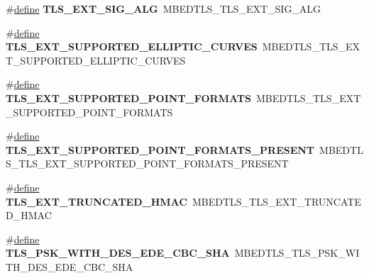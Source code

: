 \begin{DoxyCompactItemize}
\item 
\mbox{\label{compat-1_83_8h_a03991596f1740bf164b513d6e43c1f4c}} 
\#\hyperlink{structdefine}{define} {\bfseries T\+L\+S\+\_\+\+E\+X\+T\+\_\+\+S\+I\+G\+\_\+\+A\+LG}~M\+B\+E\+D\+T\+L\+S\+\_\+\+T\+L\+S\+\_\+\+E\+X\+T\+\_\+\+S\+I\+G\+\_\+\+A\+LG
\item 
\mbox{\label{compat-1_83_8h_a5027dcb3f9e79d66d008105a6a10b88b}} 
\#\hyperlink{structdefine}{define} {\bfseries T\+L\+S\+\_\+\+E\+X\+T\+\_\+\+S\+U\+P\+P\+O\+R\+T\+E\+D\+\_\+\+E\+L\+L\+I\+P\+T\+I\+C\+\_\+\+C\+U\+R\+V\+ES}~M\+B\+E\+D\+T\+L\+S\+\_\+\+T\+L\+S\+\_\+\+E\+X\+T\+\_\+\+S\+U\+P\+P\+O\+R\+T\+E\+D\+\_\+\+E\+L\+L\+I\+P\+T\+I\+C\+\_\+\+C\+U\+R\+V\+ES
\item 
\mbox{\label{compat-1_83_8h_af4c82017108e0645f315b12052e4c7b7}} 
\#\hyperlink{structdefine}{define} {\bfseries T\+L\+S\+\_\+\+E\+X\+T\+\_\+\+S\+U\+P\+P\+O\+R\+T\+E\+D\+\_\+\+P\+O\+I\+N\+T\+\_\+\+F\+O\+R\+M\+A\+TS}~M\+B\+E\+D\+T\+L\+S\+\_\+\+T\+L\+S\+\_\+\+E\+X\+T\+\_\+\+S\+U\+P\+P\+O\+R\+T\+E\+D\+\_\+\+P\+O\+I\+N\+T\+\_\+\+F\+O\+R\+M\+A\+TS
\item 
\mbox{\label{compat-1_83_8h_a66091f70d8cfd5a5d43d42c221612567}} 
\#\hyperlink{structdefine}{define} {\bfseries T\+L\+S\+\_\+\+E\+X\+T\+\_\+\+S\+U\+P\+P\+O\+R\+T\+E\+D\+\_\+\+P\+O\+I\+N\+T\+\_\+\+F\+O\+R\+M\+A\+T\+S\+\_\+\+P\+R\+E\+S\+E\+NT}~M\+B\+E\+D\+T\+L\+S\+\_\+\+T\+L\+S\+\_\+\+E\+X\+T\+\_\+\+S\+U\+P\+P\+O\+R\+T\+E\+D\+\_\+\+P\+O\+I\+N\+T\+\_\+\+F\+O\+R\+M\+A\+T\+S\+\_\+\+P\+R\+E\+S\+E\+NT
\item 
\mbox{\label{compat-1_83_8h_a11832588d5c48b20e1cefbb1149823aa}} 
\#\hyperlink{structdefine}{define} {\bfseries T\+L\+S\+\_\+\+E\+X\+T\+\_\+\+T\+R\+U\+N\+C\+A\+T\+E\+D\+\_\+\+H\+M\+AC}~M\+B\+E\+D\+T\+L\+S\+\_\+\+T\+L\+S\+\_\+\+E\+X\+T\+\_\+\+T\+R\+U\+N\+C\+A\+T\+E\+D\+\_\+\+H\+M\+AC
\item 
\mbox{\label{compat-1_83_8h_a467b50d6801535ae3dbdacfaa265d9a3}} 
\#\hyperlink{structdefine}{define} {\bfseries T\+L\+S\+\_\+\+P\+S\+K\+\_\+\+W\+I\+T\+H\+\_\+D\+E\+S\+\_\+\+E\+D\+E\+\_\+\+C\+B\+C\+\_\+\+S\+HA}~M\+B\+E\+D\+T\+L\+S\+\_\+\+T\+L\+S\+\_\+\+P\+S\+K\+\_\+\+W\+I\+T\+H\+\_\+D\+E\+S\+\_\+\+E\+D\+E\+\_\+\+C\+B\+C\+\_\+\+S\+HA

\end{DoxyCompactItemize}
